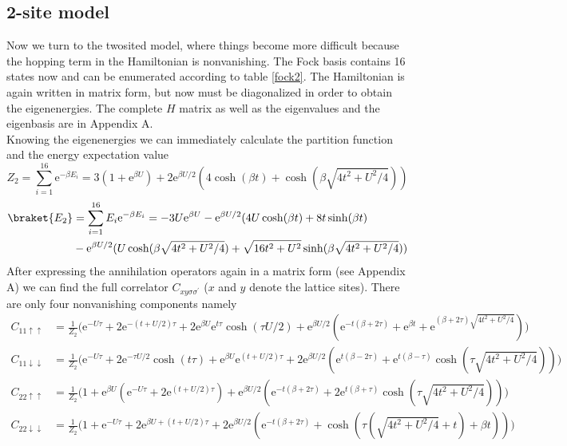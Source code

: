 \subsection{2-site model}
Now we turn to the twosited model, where things become more difficult because the hopping term in the Hamiltonian is nonvanishing. The Fock basis contains 16 states now and can be enumerated according to table \ref{fock2}. The Hamiltonian is again written in matrix form, but now must be diagonalized in order to obtain the eigenenergies. The complete $H$ matrix as well as the eigenvalues and the eigenbasis are in Appendix A. \\
Knowing the eigenenergies we can immediately calculate the partition function and the energy expectation value
\begin{equation}
	Z_2=\sum_{i=1}^{16}\text{e}^{-\beta E_i}= 3(1+\text{e}^{\beta U})+2\text{e}^{\beta U/2}(4\cosh(\beta t)+\cosh(\beta\sqrt{4t^2+U^2/4}))
\end{equation}
\begin{align}
	\braket{E_2}&= \sum_{i=1}^{16}E_i\text{e}^{-\beta E_i} = -3U\text{e}^{\beta U}-\text{e}^{\beta U/2}(4U\cosh(\beta t)+8t\sinh(\beta t)\\&-\text{e}^{\beta U/2}(U\cosh(\beta\sqrt{4t^2+U^2/4})+\sqrt{16t^2+U^2}\sinh(\beta\sqrt{4t^2+U^2/4}))\nonumber
\end{align}
After expressing the annihilation operators again in a matrix form (see Appendix A) we can find the full correlator $C_{xy\sigma\sigma^{\prime}}$ ($x$ and $y$ denote the lattice sites). There are only four nonvanishing components namely
\begin{align*}
	C_{11\uparrow\uparrow}&= \frac{1}{Z_2}\biggl(\text{e}^{-U\tau}+2\text{e}^{-(t+U/2)\tau}+2\text{e}^{\beta U}\text{e}^{t\tau}\cosh(\tau U/2)+\text{e}^{\beta U/2}(\text{e}^{-t(\beta+2\tau)}+\text{e}^{\beta t}+\text{e}^{(\beta+2\tau)\sqrt{4t^2+U^2/4}})\biggr)\\
	C_{11\downarrow\downarrow}&= \frac{1}{Z_2}\biggl(\text{e}^{-U\tau}+2\text{e}^{-\tau U/2}\cosh(t\tau)+\text{e}^{\beta U}\text{e}^{(t+U/2)\tau}+2\text{e}^{\beta U/2}(\text{e}^{t(\beta-2\tau)}+\text{e}^{t(\beta-\tau) }\cosh(\tau\sqrt{4t^2+U^2/4}))\biggr)\\
	C_{22\uparrow\uparrow}&= \frac{1}{Z_2}\biggl(1+\text{e}^{\beta U}(\text{e}^{-U\tau}+2\text{e}^{(t+U/2)\tau})+\text{e}^{\beta U/2}(\text{e}^{-t(\beta+2\tau)}+2\text{e}^{t(\beta+\tau) }\cosh(\tau\sqrt{4t^2+U^2/4}))\biggr)\\
	C_{22\downarrow\downarrow}&= \frac{1}{Z_2}\biggl(1+\text{e}^{-U\tau}+2\text{e}^{\beta U+(t+U/2)\tau}+2\text{e}^{\beta U/2}(\text{e}^{-t(\beta+2\tau)}+\cosh(\tau(\sqrt{4t^2+U^2/4}+t)+\beta t))\biggr)
\end{align*}
